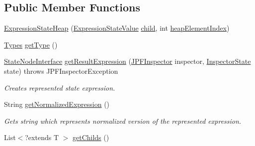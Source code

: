 \subsection*{Public Member Functions}
\begin{DoxyCompactItemize}
\item 
\hyperlink{classgov_1_1nasa_1_1jpf_1_1inspector_1_1server_1_1expression_1_1expressions_1_1_expression_state_heap_a489b4e3fadf605cfafdb6a6b69db737d}{Expression\+State\+Heap} (\hyperlink{classgov_1_1nasa_1_1jpf_1_1inspector_1_1server_1_1expression_1_1expressions_1_1_expression_state_value}{Expression\+State\+Value} \hyperlink{classgov_1_1nasa_1_1jpf_1_1inspector_1_1server_1_1expression_1_1_expression_state_unary_operator_a66041b1f569a361549e28a00f7ca5f2f}{child}, int \hyperlink{classgov_1_1nasa_1_1jpf_1_1inspector_1_1server_1_1expression_1_1expressions_1_1_expression_state_heap_afffce10742fdcd015d276f6c397a9921}{heap\+Element\+Index})
\item 
\hyperlink{enumgov_1_1nasa_1_1jpf_1_1inspector_1_1server_1_1expression_1_1_types}{Types} \hyperlink{classgov_1_1nasa_1_1jpf_1_1inspector_1_1server_1_1expression_1_1expressions_1_1_expression_state_heap_ac777ee383c9d0210c5ddc1044d84c180}{get\+Type} ()
\item 
\hyperlink{interfacegov_1_1nasa_1_1jpf_1_1inspector_1_1server_1_1programstate_1_1_state_node_interface}{State\+Node\+Interface} \hyperlink{classgov_1_1nasa_1_1jpf_1_1inspector_1_1server_1_1expression_1_1expressions_1_1_expression_state_heap_af2b2515a931a0490889645440f75d2bd}{get\+Result\+Expression} (\hyperlink{classgov_1_1nasa_1_1jpf_1_1inspector_1_1server_1_1jpf_1_1_j_p_f_inspector}{J\+P\+F\+Inspector} inspector, \hyperlink{interfacegov_1_1nasa_1_1jpf_1_1inspector_1_1server_1_1expression_1_1_inspector_state}{Inspector\+State} state)  throws J\+P\+F\+Inspector\+Exception 
\begin{DoxyCompactList}\small\item\em Creates represented state expression. \end{DoxyCompactList}\item 
String \hyperlink{classgov_1_1nasa_1_1jpf_1_1inspector_1_1server_1_1expression_1_1expressions_1_1_expression_state_heap_a1c7afc075a378e4a75dc64441f3d8dcb}{get\+Normalized\+Expression} ()
\begin{DoxyCompactList}\small\item\em Gets string which represents normalized version of the represented expression. \end{DoxyCompactList}\item 
List$<$?extends T $>$ \hyperlink{classgov_1_1nasa_1_1jpf_1_1inspector_1_1server_1_1expression_1_1_expression_state_unary_operator_ad010bcb9c4e2eb584321b5ceba8e1682}{get\+Childs} ()
\end{DoxyCompactItemize}
